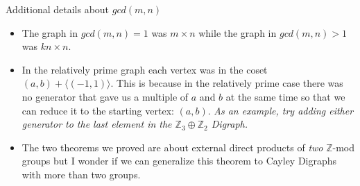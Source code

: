 \documentclass{beamer}
\begin{document}
\begin{frame}{Additional details about $gcd(m, n)$}

\begin{itemize}
    \item<1-> The graph in $gcd(m, n) = 1$ was $m \times n$ while the graph in $gcd(m, n) > 1$ was $kn \times n$.
    \item<2-> In the relatively prime graph each vertex was in the coset $(a, b) + \langle (-1, 1)\rangle$. This is because in the relatively prime case there was no generator that gave us a multiple of $a$ and $b$ at the same time so that we can reduce it to the starting vertex: $(a, b)$. \textit{As an example, try adding either generator to the last element in the $\mathbb{Z}_{3} \oplus \mathbb{Z}_{2}$ Digraph.}
    \item<3-> The two theorems we proved are about external direct products of \textit{two} $\mathbb{Z}$-mod groups but I wonder if we can generalize this theorem to Cayley Digraphs with more than two groups.
\end{itemize}
\end{frame}
\end{document}
